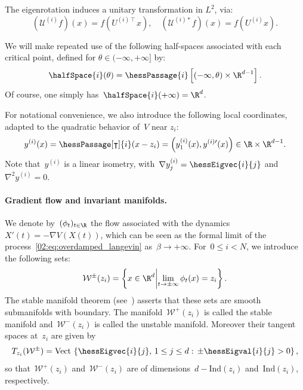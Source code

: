     The eigenrotation induces a unitary transformation in $L^2$, via:
   \begin{equation}
    \label{02:eq:eigvecs_unitary}
     \left(\mathcal U^{(i)} f\right)(x) = f\left(U^{(i)\intercal}x\right),\quad  \left(\mathcal U^{(i)*} f\right)(x) = f\left( U^{(i)}x\right).
   \end{equation}

    We will make repeated use of the following half-spaces associated with each critical point, defined for $\theta\in(-\infty,+\infty]$ by:
    \begin{equation}
        \label{02:eq:half_space}
        \halfSpace{i}(\theta) = \hessPassage{i}\left[(-\infty,\theta)\times\R^{d-1}\right].
    \end{equation}
    Of course, one simply has~$\halfSpace{i}(+\infty) = \R^d$.

    For notational convenience, we also introduce the following local coordinates, adapted to the quadratic behavior of~$V$ near $z_i$:
    \begin{equation}
        \label{02:eq:local_coordinates}
        y^{(i)}(x) = \hessPassage[\intercal]{i}(x-z_i) = \left(y_1^{(i)}(x),y^{(i)\prime}(x)\right) \in \R \times \R^{d-1}.
    \end{equation}
    Note that~$y^{(i)}$ is a linear isometry, with~$\nabla y_j^{(i)} = \hessEigvec{i}{j}$ and~$\nabla^2 y^{(i)}=0$.

    \paragraph{Gradient flow and invariant manifolds.}
    We denote by~$(\phi_t)_{t\in \R}$ the flow associated with the dynamics~$X'(t) = -\nabla V(X(t))$, which can be seen as the formal limit of the process~\eqref{02:eq:overdamped_langevin} as~$\beta\to+\infty$. For~$0\leq i< N$, we introduce the following sets:
    \begin{equation}
        \label{02:eq:stable_manifold}
        \mathcal W^{\pm}(z_i) = \left\{x\in\R^d\middle|\underset{t\to\pm\infty}{\lim}\,\phi_t(x)=z_i\right\}.
    \end{equation}
    The stable manifold theorem (see~\cite[Section 9.2]{T00}) asserts that these sets are smooth submanifolds with boundary. The manifold~$\mathcal W^+(z_i)$ is called the stable manifold and~$\mathcal W^-(z_i)$ is called the unstable manifold. Moreover their tangent spaces at~$z_i$ are given by
    \[T_{z_i}(\mathcal W^{\pm}) = \mathrm{Vect}\,\left\{\hessEigvec{i}{j},\,1\leq j\leq d:\,\pm\hessEigval{i}{j} > 0 \right\},\]
    so that~$\mathcal W^+(z_i)$ and~$\mathcal W^-(z_i)$ are of dimensions~$d-\mathrm{Ind}(z_i)$ and~$\mathrm{Ind}(z_i)$, respectively.

